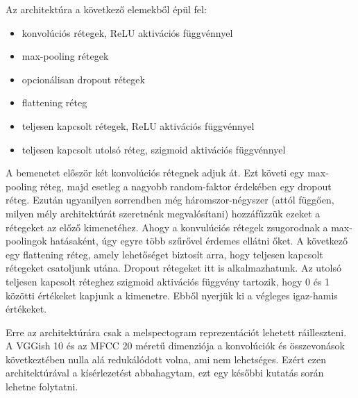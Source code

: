 Az architektúra a következő elemekből épül fel:

\begin{itemize}
 \item konvolúciós rétegek, ReLU aktivációs függvénnyel
 \item max-pooling rétegek
 \item opcionálisan dropout rétegek
 \item flattening réteg
 \item teljesen kapcsolt rétegek, ReLU aktivációs függvénnyel
 \item teljesen kapcsolt utolsó réteg, szigmoid aktivációs függvénnyel
\end{itemize}

A bemenetet először két konvolúciós rétegnek adjuk át. Ezt követi egy max-pooling réteg, majd esetleg a nagyobb random-faktor érdekében egy dropout réteg. Ezután ugyanilyen sorrendben még háromszor-négyszer (attól függően, milyen mély architektúrát szeretnénk megvalósítani) hozzáfűzzük ezeket a rétegeket az előző kimenetéhez. Ahogy a konvulúciós rétegek zsugorodnak a max-poolingok hatásaként, úgy egyre több szűrővel érdemes ellátni őket. A következő egy flattening réteg, amely lehetőséget biztosít arra, hogy teljesen kapcsolt rétegeket csatoljunk utána. Dropout rétegeket itt is alkalmazhatunk. Az utolsó teljesen kapcsolt réteghez szigmoid aktivációs függvény tartozik, hogy 0 és 1 közötti értékeket kapjunk a kimenetre. Ebből nyerjük ki a végleges igaz-hamis értékeket.

Erre az architektúrára csak a melspectogram reprezentációt lehetett ráilleszteni. A VGGish 10 és az MFCC 20 méretű dimenziója a konvolúciók és összevonások következtében nulla alá redukálódott volna, ami nem lehetséges. Ezért ezen architektúrával a kísérlezetést abbahagytam, ezt egy későbbi kutatás során lehetne folytatni.

